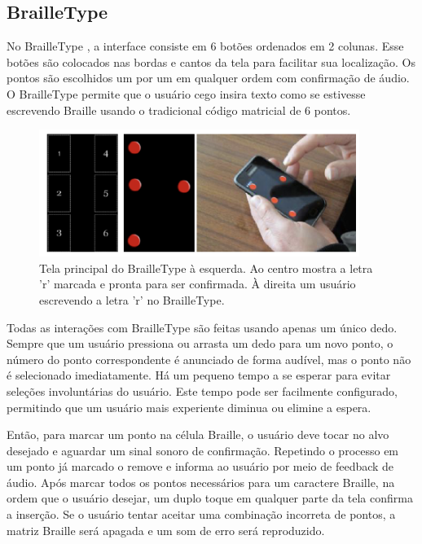 \subsection{BrailleType}

No BrailleType \parencite{REF06}, a interface consiste em 6 botões ordenados em 2 colunas. Esse botões são colocados nas bordas e cantos da tela para facilitar sua localização. Os pontos são escolhidos um por um em qualquer ordem com confirmação de áudio. O BrailleType permite que o usuário cego insira texto como se estivesse escrevendo Braille usando o tradicional código matricial de 6 pontos.

\begin{figure}[h]
    \centering
    \includegraphics{ch02/assets/brailletype.png}
    \decoRule
    \caption[Interface do BrailleType]{Tela principal do BrailleType à esquerda. Ao centro mostra a letra 'r' marcada e pronta para ser confirmada. À direita um usuário escrevendo a letra 'r' no BrailleType. \parencite{REF06}}
    \label{fig:ch02-brailletype}
\end{figure}

Todas as interações com BrailleType são feitas usando apenas um único dedo. Sempre que um usuário pressiona ou arrasta um dedo para um novo ponto, o número do ponto correspondente é anunciado de forma audível, mas o ponto não é selecionado imediatamente. Há um pequeno tempo a se esperar para evitar seleções involuntárias do usuário. Este tempo pode ser facilmente configurado, permitindo que um usuário mais experiente diminua ou elimine a espera. 

Então, para marcar um ponto na célula Braille, o usuário deve tocar no alvo desejado e aguardar um sinal sonoro de confirmação. Repetindo o processo em um ponto já marcado o remove e informa ao usuário por meio de feedback de áudio. Após marcar todos os pontos necessários para um caractere Braille, na ordem que o usuário desejar, um duplo toque em qualquer parte da tela confirma a inserção. Se o usuário tentar aceitar uma combinação incorreta de pontos, a matriz Braille será apagada e um som de erro será reproduzido.

